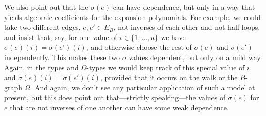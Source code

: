 \documentclass{memo-l}
\theoremstyle{plain}
\newtheorem{theorem}{Theorem}[section]
\theoremstyle{definition}
\numberwithin{section}{chapter}
\numberwithin{equation}{chapter}
\theoremstyle{plain}
\theoremstyle{definition}
\newcommand\cS{\mathcal{S}}
\begin{document}
We also point out that the $\sigma(e)$ can have dependence,
but only in a way that yields algebraic coefficients for the 
expansion polynomials.
For example, we could take two different edges, $e,e'\in E_B$,
not inverses of each other and not half-loops, and insist
that, say, for one value of $i\in\{1,\ldots,n\}$ we have
$\sigma(e)(i)=\sigma(e')(i)$, and otherwise choose
the rest of $\sigma(e)$ and $\sigma(e')$ independently.  This makes 
these two $\sigma$ values dependent, but only on a mild way.
Again, in the types and $\Omega$-types we would keep track of this
special value of $i$ and $\sigma(e)(i)=\sigma(e')(i)$, provided
that it occurs on the walk or the $B$-graph $\Omega$.
And again, we don't see any particular application of such a model
at present, but this does point out that---strictly speaking---the
values of $\sigma(e)$ for $e$ that are not inverses of one another
can have some weak dependence.


% 
% 
% 
\end{document}
